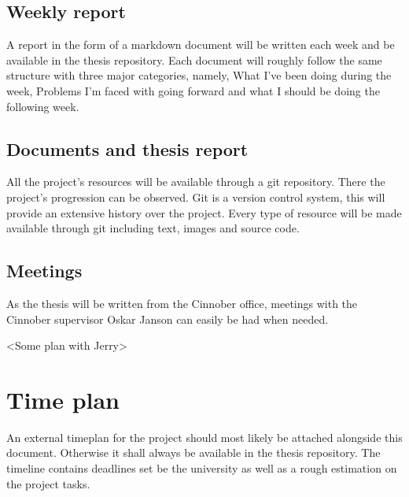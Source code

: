 \documentclass[10pt, titlepage, oneside, a4paper]{article}
\begin{document}
\subsection{Weekly report}

A report in the form of a markdown document will be written each week and be available in the thesis repository\cite{repository:me:thesis}. Each document will roughly follow the same structure with three major categories, namely, What I've been doing during the week, Problems I'm faced with going forward and what I should be doing the following week.

\subsection{Documents and thesis report}

All the project's resources will be available through a git repository\cite{repository:me:thesis}. There the project's progression can be observed. Git is a version control system, this will provide an extensive history over the project. Every type of resource will be made available through git including text, images and source code. 

\subsection{Meetings}

As the thesis will be written from the Cinnober office, meetings with the Cinnober supervisor Oskar Janson can easily be had when needed.

<Some plan with Jerry>


\section{Time plan}

An external timeplan for the project should most likely be attached alongside this document. Otherwise it shall always be available in the thesis repository\cite{repository:me:thesis}. The timeline contains deadlines set be the university as well as a rough estimation on the project tasks.






\end{document}
